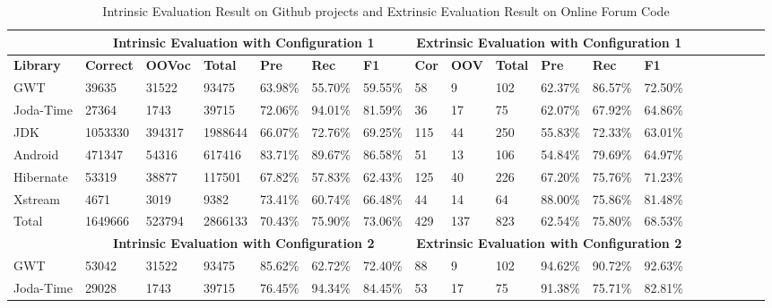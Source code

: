   \begin{table}[t]
  \tiny
  \centering
  \caption{Intrinsic Evaluation Result on Github projects and Extrinsic Evaluation Result on Online Forum Code}
\begin{tabular}{|l|l|l|l|l|l|l|l|l|l|l|l|l|l|l|l|l|l|l|}
\hline
          &  \multicolumn{6}{c|}{\textbf{Intrinsic Evaluation with Configuration 1}} &  \multicolumn{6}{c|}{\textbf{Extrinsic Evaluation with Configuration 1}}           \\
\hline
\textbf{Library}   & \textbf{Correct} & \textbf{OOVoc}  & \textbf{Total}   & \textbf{Pre} & \textbf{Rec}  & \textbf{F1} & \textbf{Cor} & \textbf{OOV}  & \textbf{Total}   & \textbf{Pre} & \textbf{Rec}  & \textbf{F1} \\ \hline
GWT       & 39635    & 31522  & 93475   & 63.98\%   & 55.70\% & 59.55\%   & 58              & 9     & 102   & 62.37\%   & 86.57\% & 72.50\%  \\ \hline
Joda-Time & 27364      & 1743   & 39715   & 72.06\%   & 94.01\% & 81.59\%  & 36             & 17    & 75    & 62.07\%   & 67.92\% & 64.86\%  \\ \hline
JDK       & 1053330   & 394317 & 1988644 & 66.07\%   & 72.76\% & 69.25\% & 115            & 44    & 250   & 55.83\%   & 72.33\% & 63.01\%  \\ \hline
Android   & 471347     & 54316  & 617416  & 83.71\%   & 89.67\% & 86.58\% & 51             & 13    & 106   & 54.84\%   & 79.69\% & 64.97\%  \\ \hline
Hibernate & 53319      & 38877  & 117501  & 67.82\%   & 57.83\% & 62.43\% & 125            & 40    & 226   & 67.20\%   & 75.76\% & 71.23\%  \\ \hline
Xstream   & 4671      & 3019   & 9382    & 73.41\%   & 60.74\% & 66.48\%  & 44             & 14    & 64    & 88.00\%   & 75.86\% & 81.48\%  \\ \hline
Total     & 1649666   & 523794 & 2866133 & 70.43\%   & 75.90\% & 73.06\%   & 429           & 137   & 823   & 62.54\%   & 75.80\% & 68.53\%  \\ \hline
          & \multicolumn{6}{c|}{\textbf{Intrinsic Evaluation with Configuration 2}}  & \multicolumn{6}{c|}{\textbf{Extrinsic Evaluation with Configuration 2}}   \\
\hline
GWT       & 53042                                     & 31522  & 93475   & 85.62\%   & 62.72\% & 72.40\%    & 88              & 9     & 102   & 94.62\%   & 90.72\% & 92.63\%  \\ \hline
Joda-Time & 29028                                     & 1743   & 39715   & 76.45\%   & 94.34\% & 84.45\%  & 53             & 17    & 75    & 91.38\%   & 75.71\% & 82.81\% \\

\end{tabular}
\end{table}

